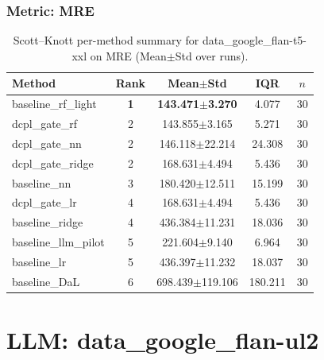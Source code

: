 \subsubsection*{Metric: MRE}
\begin{table}[H]
\centering
\scriptsize
\setlength{\tabcolsep}{4pt}
\renewcommand{\arraystretch}{1.1}
\caption{Scott--Knott per-method summary for data\_google\_flan-t5-xxl on MRE (Mean$\pm$Std over runs).}
\label{tab:sk_data_google_flan-t5-xxl_MRE}
\begin{tabular}{l|c|c|c|c}
\hline
\textbf{Method} & \textbf{Rank} & \textbf{Mean$\pm$Std} & \textbf{IQR} & \textbf{$n$} \\
\hline
\rowcolor{red!15} baseline\_rf\_light & \textbf{1} & \textbf{143.471$\pm$3.270} & 4.077 & 30 \\
dcpl\_gate\_rf & 2 & 143.855$\pm$3.165 & 5.271 & 30 \\
dcpl\_gate\_nn & 2 & 146.118$\pm$22.214 & 24.308 & 30 \\
dcpl\_gate\_ridge & 2 & 168.631$\pm$4.494 & 5.436 & 30 \\
baseline\_nn & 3 & 180.420$\pm$12.511 & 15.199 & 30 \\
dcpl\_gate\_lr & 4 & 168.631$\pm$4.494 & 5.436 & 30 \\
baseline\_ridge & 4 & 436.384$\pm$11.231 & 18.036 & 30 \\
baseline\_llm\_pilot & 5 & 221.604$\pm$9.140 & 6.964 & 30 \\
baseline\_lr & 5 & 436.397$\pm$11.232 & 18.037 & 30 \\
baseline\_DaL & 6 & 698.439$\pm$119.106 & 180.211 & 30 \\
\hline
\end{tabular}
\end{table}


\newpage

\section*{LLM: data\_google\_flan-ul2}

